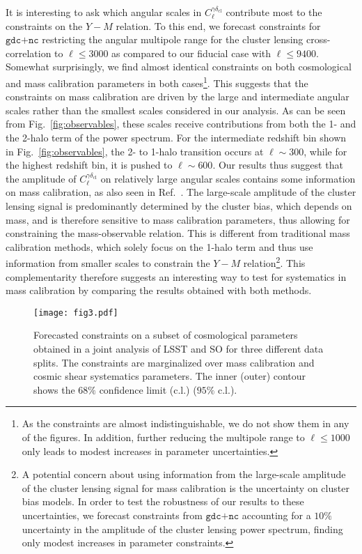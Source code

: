 \documentclass[%
 reprint,
nofootinbib,
 amsmath,amssymb,
 aps,
]{revtex4-1}
\begin{document}
It is interesting to ask which angular scales in $C_{\ell}^{\gamma \delta_{\mathrm{cl}}}$ contribute most to the constraints on the $Y-M$ relation. To this end, we forecast constraints for $\texttt{gdc+nc}$ restricting the angular multipole range for the cluster lensing cross-correlation to $\ell \leq 3000$ as compared to our fiducial case with $\ell \leq 9400$. Somewhat surprisingly, we find almost identical constraints on both cosmological and mass calibration parameters in both cases\footnote{As the constraints are almost indistinguishable, we do not show them in any of the figures. In addition, further reducing the multipole range to $\ell \leq 1000$ only leads to modest increases in parameter uncertainties.}. This suggests that the constraints on mass calibration are driven by the large and intermediate angular scales rather than the smallest scales considered in our analysis. As can be seen from Fig.~\ref{fig:observables}, these scales receive contributions from both the 1- and the 2-halo term of the power spectrum. For the intermediate redshift bin shown in Fig.~\ref{fig:observables}, the 2- to 1-halo transition occurs at $\ell \sim 300$, while for the highest redshift bin, it is pushed to $\ell \sim 600$. Our results thus suggest that the amplitude of $C_{\ell}^{\gamma \delta_{\mathrm{cl}}}$ on relatively large angular scales contains some information on mass calibration, as also seen in Ref.~\cite{Majumdar:2004}. The large-scale amplitude of the cluster lensing signal is predominantly determined by the cluster bias, which depends on mass, and is therefore sensitive to mass calibration parameters, thus allowing for constraining the mass-observable relation. This is different from traditional mass calibration methods, which solely focus on the 1-halo term and thus use information from smaller scales to constrain the $Y-M$ relation\footnote{A potential concern about using information from the large-scale amplitude of the cluster lensing signal for mass calibration is the uncertainty on cluster bias models. In order to test the robustness of our results to these uncertainties, we forecast constraints from $\texttt{gdc+nc}$ accounting for a $10 \%$ uncertainty in the amplitude of the cluster lensing power spectrum, finding only modest increases in parameter constraints.}. This complementarity therefore suggests an interesting way to test for systematics in mass calibration by comparing the results obtained with both methods. 

\begin{figure*}
\begin{center}
\texttt{[image: fig3.pdf]}
 \caption{Forecasted constraints on a subset of cosmological parameters obtained in a joint analysis of LSST and SO for three different data splits. The constraints are marginalized over mass calibration and cosmic shear systematics parameters. The inner (outer) contour shows the $68 \%$ confidence limit (c.l.) ($95 \%$ c.l.).}
\label{fig:constraints-data-splits-cosmo-H0-As-w0-wa}
\end{center}
\end{figure*}
\end{document}

